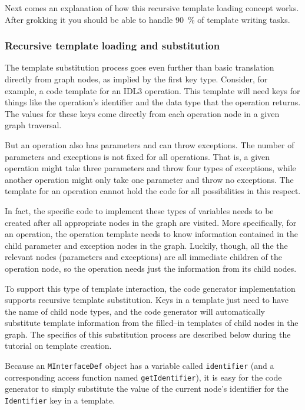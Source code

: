 Next comes an explanation of how this recursive template loading concept works.
After grokking it you should be able to handle 90~\% of template writing tasks.

\subsubsection{Recursive template loading and substitution}
\label{subsubsection:component-recursive-substitution}

The template substitution process goes even further than basic translation
directly from graph nodes, as implied by the first key type. Consider, for
example, a code template for an IDL3 operation. This template will need keys for
things like the operation's identifier and the data type that the operation
returns. The values for these keys come directly from each operation node in a
given graph traversal.

But an operation also has parameters and can throw exceptions. The number of
parameters and exceptions is not fixed for all operations. That is, a given
operation might take three parameters and throw four types of exceptions, while
another operation might only take one parameter and throw no exceptions. The
template for an operation cannot hold the code for all possibilities in this
respect.

In fact, the specific code to implement these types of variables needs to be
created after all appropriate nodes in the graph are visited. More specifically,
for an operation, the operation template needs to know information contained in
the child parameter and exception nodes in the graph. Luckily, though, all the
the relevant nodes (parameters and exceptions) are all immediate children of the
operation node, so the operation needs just the information from its child
nodes.

To support this type of template interaction, the code generator implementation
supports recursive template substitution. Keys in a template just need to have
the name of child node types, and the code generator will automatically
substitute template information from the filled--in templates of child nodes in
the graph. The specifics of this substitution process are described below during
the tutorial on template creation.

Because an {\tt MInterfaceDef} object has a variable called {\tt identifier}
(and a corresponding access function named {\tt getIdentifier}), it is easy for
the code generator to simply substitute the value of the current node's
identifier for the {\tt Identifier} key in a template.

